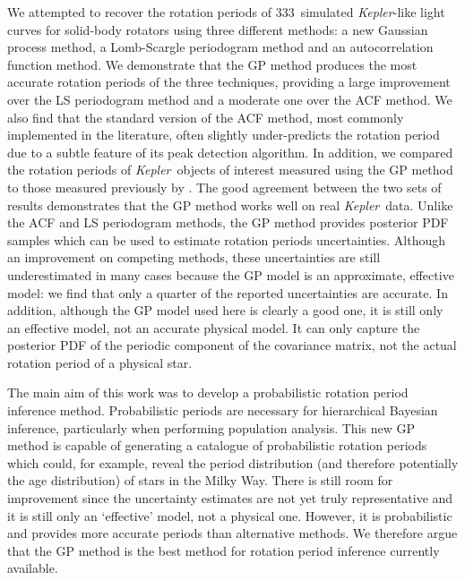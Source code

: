 \documentclass[useAMS, usenatbib, preprint, 12pt]{aastex}
\newcommand{\Kepler}{{\it Kepler}}
\newcommand{\kepler}{\Kepler}
\newcommand{\naigrain}{333}
\newcommand{\tdmcomment}[1]{{\color{blue}#1}}
\begin{document}
We attempted to recover the rotation periods of \naigrain\ simulated
\kepler-like light curves for solid-body rotators \citep{Aigrain2015} using
three different methods: a new Gaussian process method, a Lomb-Scargle
periodogram method and an autocorrelation function method.
We demonstrate that the GP method produces the most accurate rotation periods
of the three techniques, providing a large improvement over the LS periodogram
method and a moderate one over the ACF method.
We also find that the standard version of the ACF method, most commonly
implemented in the literature, often slightly under-predicts the rotation
period due to a subtle feature of its peak detection algorithm.
In addition, we compared the rotation periods of \kepler\ objects of
interest measured using the GP method to those measured previously by
\citet{Mcquillan2013}.
The good agreement between the two sets of results demonstrates that the GP
method works well on real \kepler\ data.
Unlike the ACF and LS periodogram methods, the GP method provides posterior
PDF samples which can be used to estimate rotation periods uncertainties.
Although an improvement on competing methods, these uncertainties are still
underestimated in many cases because the GP model is an approximate, effective
model: we find that only a quarter of the reported uncertainties are accurate.
In addition, although the GP model used here is clearly a good one, it is
still only an effective model, not an accurate physical model.
It can only capture the posterior PDF of the periodic component of the
covariance matrix, not the actual rotation period of a physical star.

The main aim of this work was to develop a probabilistic rotation period
inference method.
Probabilistic periods are necessary for hierarchical Bayesian inference,
particularly when performing population analysis.
This new GP method is capable of generating a catalogue of probabilistic
rotation periods which could, for example, reveal the period distribution
(and therefore potentially the age distribution) of stars in the Milky Way.
There is still room for improvement since the uncertainty estimates are not
yet truly representative and it is still only an `effective' model, not a
physical one.
However, it is probabilistic and provides more accurate periods than
alternative methods.
We therefore argue that the GP method is the best method for rotation period
inference currently available.
\end{document}
